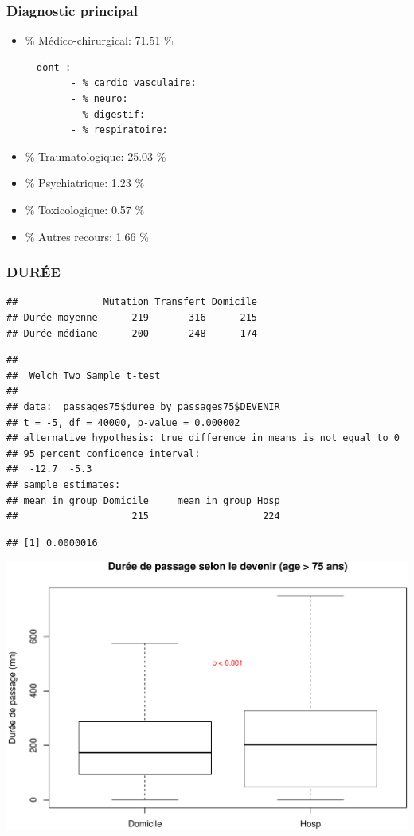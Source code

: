 \documentclass[]{article}
\begin{document}
\subsubsection{Diagnostic principal}\label{diagnostic-principal-1}

\begin{itemize}
\item
  \% Médico-chirurgical: 71.51 \%

\begin{verbatim}
- dont :
        - % cardio vasculaire:
        - % neuro:
        - % digestif:
        - % respiratoire:
\end{verbatim}
\item
  \% Traumatologique: 25.03 \%
\item
  \% Psychiatrique: 1.23 \%
\item
  \% Toxicologique: 0.57 \%
\item
  \% Autres recours: 1.66 \%
\end{itemize}

\subsubsection{DURÉE}\label{duree}

\begin{verbatim}
##               Mutation Transfert Domicile
## Durée moyenne      219       316      215
## Durée médiane      200       248      174
\end{verbatim}

\begin{verbatim}
## 
##  Welch Two Sample t-test
## 
## data:  passages75$duree by passages75$DEVENIR
## t = -5, df = 40000, p-value = 0.000002
## alternative hypothesis: true difference in means is not equal to 0
## 95 percent confidence interval:
##  -12.7  -5.3
## sample estimates:
## mean in group Domicile     mean in group Hosp 
##                    215                    224
\end{verbatim}

\begin{verbatim}
## [1] 0.0000016
\end{verbatim}

\includegraphics{rapport2014_V4_files/figure-latex/duree_passage_75-1.pdf}
\end{document}
